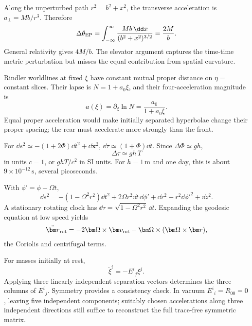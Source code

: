 \begin{solution}
Along the unperturbed path \(r^2=b^2+x^2\), the transverse acceleration is
\(a_\perp=Mb/r^3\).  Therefore
\[
\Delta\theta_{\rm EP}
=\int_{-\infty}^{\infty}\frac{Mb\,\dd x}{(b^2+x^2)^{3/2}}
=\frac{2M}{b}.
\]
General relativity gives \(4M/b\).  The elevator argument captures the
time-time metric perturbation but misses the equal contribution from spatial
curvature.
\end{solution}

\begin{solution}
Rindler worldlines at fixed \(\xi\) have constant mutual proper distance on
\(\eta=\) constant slices.  Their lapse is \(N=1+a_0\xi\), and their
four-acceleration magnitude is
\[
a(\xi)=\partial_\xi\ln N=\frac{a_0}{1+a_0\xi}.
\]
Equal proper acceleration would make initially separated hyperbolae change
their proper spacing; the rear must accelerate more strongly than the front.
\end{solution}

\begin{solution}
For \(\dd s^2\simeq-(1+2\Phi)\dd t^2+\dd\bm x^2\),
\(\dd\tau\simeq(1+\Phi)\dd t\).  Since
\(\Delta\Phi\simeq gh\),
\[
\Delta\tau\simeq gh\,T
\]
in units \(c=1\), or \(ghT/c^2\) in SI units.  For \(h=1\,\mathrm m\) and one
day, this is about \(9\times10^{-12}\,\mathrm s\), several picoseconds.
\end{solution}

\begin{solution}
With \(\phi'=\phi-\Omega t\),
\[
\dd s^2=-(1-\Omega^2r^2)\dd t^2
+2\Omega r^2\dd t\,\dd\phi'
+\dd r^2+r^2\dd\phi'^2+\dd z^2.
\]
A stationary rotating clock has
\(\dd\tau=\sqrt{1-\Omega^2r^2}\,\dd t\).  Expanding the geodesic equation at
low speed yields
\[
\ddot{\bm r}_{\rm rot}
=-2\bm\Omega\times\bm v_{\rm rot}
-\bm\Omega\times(\bm\Omega\times\bm r),
\]
the Coriolis and centrifugal terms.
\end{solution}

\begin{solution}
For masses initially at rest,
\[
\ddot\xi^i=-E^i{}_j\xi^j.
\]
Applying three linearly independent separation vectors determines the three
columns of \(E^i{}_j\).  Symmetry provides a consistency check.  In vacuum
\(E^i{}_i=R_{00}=0\), leaving five independent components; suitably chosen
accelerations along three independent directions still suffice to reconstruct
the full trace-free symmetric matrix.
\end{solution}
